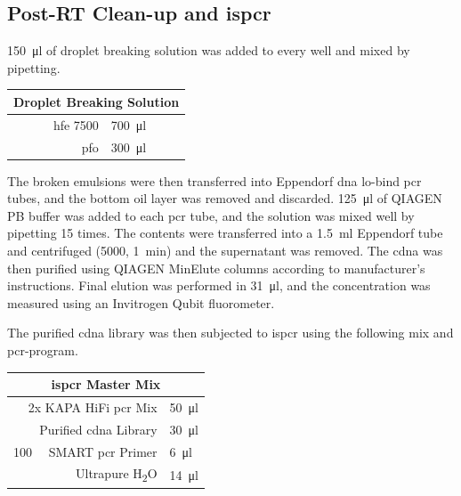 \begin{appendix}
\begin{multicols}{2}
\subsection{Post-RT Clean-up and \acrshort{ispcr}}
\SI{150}{\ul} of droplet breaking solution was added to every well and mixed by pipetting.\pms

\begin{center}
\begin{tabular}{r|l}
	\multicolumn{2}{c}{Droplet Breaking Solution} \\
	\hline
	\acrshort{hfe} 7500 & \SI{700}{\ul} \\
	\acrshort{pfo} & \SI{300}{\ul} \\
\end{tabular}
\end{center}
\medskip

The broken emulsions were then transferred into Eppendorf \acrshort{dna} lo-bind \acrshort{pcr} tubes, and the bottom oil layer was removed and discarded. \SI{125}{\ul} of QIAGEN PB buffer was added to each \acrshort{pcr} tube, and the solution was mixed well by pipetting 15 times. The contents were transferred into a \SI{1.5}{\ml} Eppendorf tube and centrifuged (\SI{5000}{\rcf}, \SI{1}{\minute}) and the supernatant was removed. The \acrshort{cdna} was then purified using QIAGEN MinElute columns according to manufacturer's instructions. Final elution was performed in \SI{31}{\ul}, and the concentration was measured using an Invitrogen Qubit fluorometer.\pms

The purified \acrshort{cdna} library was then subjected to \acrshort{ispcr} using the following mix and \acrshort{pcr}-program.\pms

\begin{center}
\begin{tabular}{r|l}
	\multicolumn{2}{c}{\acrshort{ispcr} Master Mix} \\
	\hline
	2x KAPA HiFi \acrshort{pcr} Mix & \SI{50}{\ul} \\
	Purified \acrshort{cdna} Library & \SI{30}{\ul} \\
	\SI{100}{\micro\molar} SMART \acrshort{pcr} Primer & \SI{6}{\ul} \\
	Ultrapure H\textsubscript{2}O & \SI{14}{\ul} \\
\end{tabular}
\end{center}
\medskip


\end{multicols}
\end{appendix}
